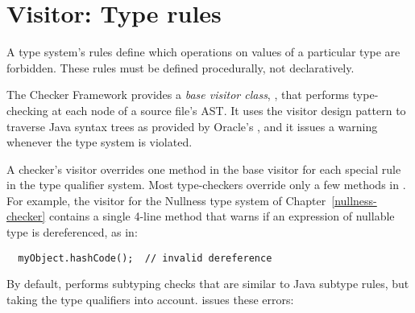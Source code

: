 \section{Visitor: Type rules\label{extending-visitor}}

A type system's rules define which operations on values of a
particular type are forbidden.
These rules must be defined procedurally, not declaratively.

The Checker Framework provides a \textit{base visitor class},
, that performs type-checking at each node of a
source file's AST\@.  It uses the visitor design pattern to traverse
Java syntax trees as provided by Oracle's
,
and it issues a warning whenever the type system is violated.

A checker's visitor overrides one method in the base visitor for each special
rule in the type qualifier system.  Most type-checkers
override only a few methods in .  For example, the
visitor for the Nullness type system of Chapter~\ref{nullness-checker}
contains a single 4-line method that warns if an expression of nullable type
is dereferenced, as in:
\begin{Verbatim}
  myObject.hashCode();  // invalid dereference
\end{Verbatim}



By default,  performs subtyping checks that are
similar to Java subtype rules, but taking the type qualifiers into account.
 issues these errors:

